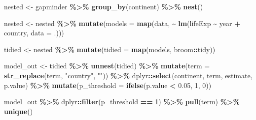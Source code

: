 \documentclass[
]{book}
\newenvironment{Shaded}{\begin{snugshade}}{\end{snugshade}}
\newcommand{\DataTypeTok}[1]{\textcolor[rgb]{0.13,0.29,0.53}{#1}}
\newcommand{\DecValTok}[1]{\textcolor[rgb]{0.00,0.00,0.81}{#1}}
\newcommand{\FloatTok}[1]{\textcolor[rgb]{0.00,0.00,0.81}{#1}}
\newcommand{\KeywordTok}[1]{\textcolor[rgb]{0.13,0.29,0.53}{\textbf{#1}}}
\newcommand{\NormalTok}[1]{#1}
\newcommand{\OperatorTok}[1]{\textcolor[rgb]{0.81,0.36,0.00}{\textbf{#1}}}
\newcommand{\StringTok}[1]{\textcolor[rgb]{0.31,0.60,0.02}{#1}}
\begin{document}
\begin{Shaded}
\begin{Highlighting}[]
\NormalTok{nested \textless{}{-}}\StringTok{ }\NormalTok{gapminder }\OperatorTok{\%\textgreater{}\%}
\StringTok{  }\KeywordTok{group\_by}\NormalTok{(continent) }\OperatorTok{\%\textgreater{}\%}
\StringTok{  }\KeywordTok{nest}\NormalTok{()}

\NormalTok{nested \textless{}{-}}\StringTok{ }\NormalTok{nested }\OperatorTok{\%\textgreater{}\%}
\StringTok{  }\KeywordTok{mutate}\NormalTok{(}\DataTypeTok{models =} \KeywordTok{map}\NormalTok{(data, }\OperatorTok{\textasciitilde{}}\StringTok{ }\KeywordTok{lm}\NormalTok{(lifeExp }\OperatorTok{\textasciitilde{}}\StringTok{ }\NormalTok{year }\OperatorTok{+}\StringTok{ }\NormalTok{country, }\DataTypeTok{data =}\NormalTok{ .)))}

\NormalTok{tidied \textless{}{-}}\StringTok{ }\NormalTok{nested }\OperatorTok{\%\textgreater{}\%}
\StringTok{  }\KeywordTok{mutate}\NormalTok{(}\DataTypeTok{tidied =} \KeywordTok{map}\NormalTok{(models, broom}\OperatorTok{::}\NormalTok{tidy))}

\NormalTok{model\_out \textless{}{-}}\StringTok{ }\NormalTok{tidied }\OperatorTok{\%\textgreater{}\%}
\StringTok{  }\KeywordTok{unnest}\NormalTok{(tidied) }\OperatorTok{\%\textgreater{}\%}
\StringTok{  }\KeywordTok{mutate}\NormalTok{(}\DataTypeTok{term =} \KeywordTok{str\_replace}\NormalTok{(term, }\StringTok{"country"}\NormalTok{, }\StringTok{""}\NormalTok{)) }\OperatorTok{\%\textgreater{}\%}
\StringTok{  }\NormalTok{dplyr}\OperatorTok{::}\KeywordTok{select}\NormalTok{(continent, term, estimate, p.value) }\OperatorTok{\%\textgreater{}\%}
\StringTok{  }\KeywordTok{mutate}\NormalTok{(}\DataTypeTok{p\_threshold =} \KeywordTok{ifelse}\NormalTok{(p.value }\OperatorTok{\textless{}}\StringTok{ }\FloatTok{0.05}\NormalTok{, }\DecValTok{1}\NormalTok{, }\DecValTok{0}\NormalTok{))}

\NormalTok{model\_out }\OperatorTok{\%\textgreater{}\%}
\StringTok{  }\NormalTok{dplyr}\OperatorTok{::}\KeywordTok{filter}\NormalTok{(p\_threshold }\OperatorTok{==}\StringTok{ }\DecValTok{1}\NormalTok{) }\OperatorTok{\%\textgreater{}\%}
\StringTok{  }\KeywordTok{pull}\NormalTok{(term) }\OperatorTok{\%\textgreater{}\%}
\StringTok{  }\KeywordTok{unique}\NormalTok{()}
\end{Highlighting}
\end{Shaded}
\end{document}
